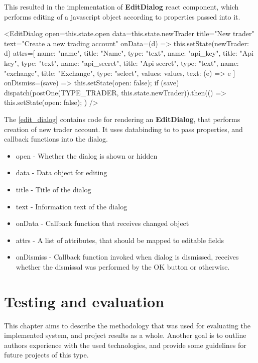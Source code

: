 This resulted in the implementation of \textbf{EditDialog} react component, which performs editing of a javascript object according
to properties passed into it.

\begin{code}[language=html,label={edit_dialog},caption={EditDialog for creation of Trader account}]
<EditDialog
    open={this.state.open}
    data={this.state.newTrader}
    title="New trader"
    text="Create a new trading account"
    onData={(d) => {
        this.setState({newTrader: d})
    }}
    attrs={[
        {name: "name", title: "Name", type: "text"},
        {name: "api_key", title: "Api key", type: "text"},
        {name: "api_secret", title: "Api secret", type: "text"},
        {name: "exchange", title: "Exchange", type: "select", values: values, text: (e) => e}
    ]}
    onDismiss={(save) => {
        this.setState({open: false});
        if (save) {
            dispatch(postOne(TYPE_TRADER, this.state.newTrader)).then(() => {
                this.setState({open: false});
            })
        }
    }}
/>
\end{code}

The \autoref{edit_dialog} contains code for rendering an \textbf{EditDialog}, that performs creation of new trader
account. It uses databinding to to pass properties, and callback functions into the dialog.
\begin{itemize}
    \item {open -} Whether the dialog is shown or hidden
    \item {data - } Data object for editing
    \item {title - } Title of the dialog
    \item {text - } Information text of the dialog
    \item {onData - } Callback function that receives changed object
    \item {attrs - } A list of attributes, that should be mapped to editable fields
    \item {onDismiss - } Callback function invoked when dialog is dismissed, receives whether the dismissal was performed
    by the OK button or otherwise.
\end{itemize}


\chapter{Testing and evaluation}
This chapter aims to describe the methodology that was used for evaluating the implemented system, and project results
as a whole. Another goal is to outline authors experience with the used technologies, and provide some guidelines for future
projects of this type.

